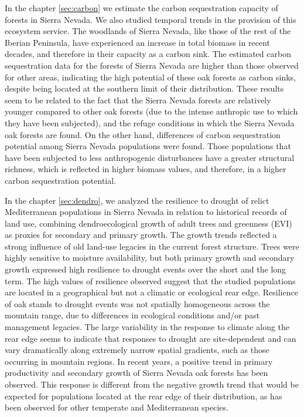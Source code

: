 In the \textcolor{ctcolormain}{chapter \ref{sec:carbon}} we estimate the carbon sequestration capacity of \Qp forests in Sierra Nevada. We also studied temporal trends in the provision of this ecosystem service. The \Qp woodlands of Sierra Nevada, like those of the rest of the Iberian Peninsula, have experienced an increase in total biomass in recent decades, and therefore in their capacity as a carbon sink. The estimated carbon sequestration data for the \Qp forests of Sierra Nevada are higher than those observed for other areas, indicating the high potential of these oak forests as carbon sinks, despite being located at the southern limit of their distribution. These results seem to be related to the fact that the Sierra Nevada \Qp forests are relatively younger compared to other oak forests (due to the intense anthropic use to which they have been subjected), and the refuge conditions in which the Sierra Nevada oak forests are found. On the other hand, differences of carbon sequestration potential among Sierra Nevada \Qp populations were found. Those populations that have been subjected to less anthropogenic disturbances have a greater structural richness, which is reflected in higher biomass values, and therefore, in a higher carbon sequestration potential. 

In the \textcolor{ctcolormain}{chapter \ref{sec:dendro}}, we analyzed the resilience to drought of relict Mediterranean \Qp populations in Sierra Nevada in relation to historical records of land use, combining dendroecological growth of adult trees and greenness (EVI) as proxies for secondary and primary growth. The growth trends reflected a strong influence of old land-use legacies in the current forest structure. Trees were highly sensitive to moisture availability, but both primary growth and secondary growth expressed high resilience to drought events over the short and the long term. The high values of resilience observed suggest that the studied \Qp populations are located in a geographical but not a climatic or ecological rear edge. Resilience of oak stands to drought events was not spatially homogeneous across the mountain range, due to differences in ecological conditions and/or past management legacies. The large variability in the response to climate along the rear edge seems to indicate that responses to drought are site-dependent and can vary dramatically along extremely narrow spatial gradients, such as those occurring in mountain regions. In recent years, a positive trend in primary productivity and secondary growth of Sierra Nevada oak forests has been observed. This response is different from the negative growth trend that would be expected for populations located at the rear edge of their distribution, as has been observed for other temperate and Mediterranean species. 

